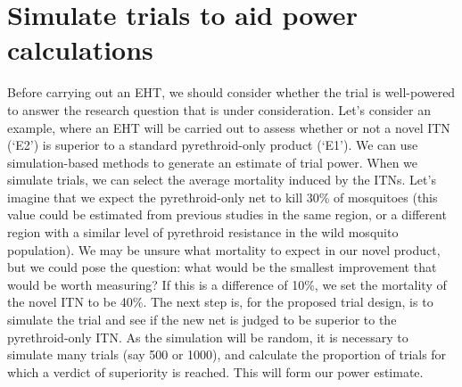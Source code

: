 \documentclass[11pt]{article}
\begin{document}
\section{Simulate trials to aid power calculations}

Before carrying out an EHT, we should consider whether the trial is well-powered to answer the research question that is under consideration. Let's consider an example, where an EHT will be carried out to assess whether or not a novel ITN (`E2') is superior to a standard pyrethroid-only product (`E1'). We can use simulation-based methods to generate an estimate of trial power. When we simulate trials, we can select the average mortality induced by the ITNs. Let's imagine that we expect the pyrethroid-only net to kill 30\% of mosquitoes (this value could be estimated from previous studies in the same region, or a different region with a similar level of pyrethroid resistance in the wild mosquito population). We may be unsure what mortality to expect in our novel product, but we could pose the question: what would be the smallest improvement that would be worth measuring? If this is a difference of 10\%, we set the mortality of the novel ITN to be 40\%. The next step is, for the proposed trial design, is to simulate the trial and see if the new net is judged to be superior to the pyrethroid-only ITN. As the simulation will be random, it is necessary to simulate many trials (say 500 or 1000), and calculate the proportion of trials for which a verdict of superiority is reached. This will form our power estimate.
\end{document}
